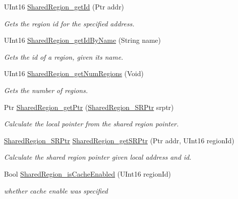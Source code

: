 \begin{DoxyCompactItemize}
UInt16 \hyperlink{_shared_region_8h_afc6f82dd851547d6d6221a779be945dd}{SharedRegion\_\-getId} (Ptr addr)
\begin{DoxyCompactList}\small\item\em Gets the region id for the specified address. \item\end{DoxyCompactList}\item 
UInt16 \hyperlink{_shared_region_8h_a67a530716a59b8794fee523cc8845f2c}{SharedRegion\_\-getIdByName} (String name)
\begin{DoxyCompactList}\small\item\em Gets the id of a region, given its name. \item\end{DoxyCompactList}\item 
UInt16 \hyperlink{_shared_region_8h_a5fb23b15b5321edd51438108b7fd9cfe}{SharedRegion\_\-getNumRegions} (Void)
\begin{DoxyCompactList}\small\item\em Gets the number of regions. \item\end{DoxyCompactList}\item 
Ptr \hyperlink{_shared_region_8h_a2b64c07cb305a034417a42fb1ed8e7a9}{SharedRegion\_\-getPtr} (\hyperlink{_shared_region_8h_a3efe06da0fa1fcbb3b271278ddd9b410}{SharedRegion\_\-SRPtr} srptr)
\begin{DoxyCompactList}\small\item\em Calculate the local pointer from the shared region pointer. \item\end{DoxyCompactList}\item 
\hyperlink{_shared_region_8h_a3efe06da0fa1fcbb3b271278ddd9b410}{SharedRegion\_\-SRPtr} \hyperlink{_shared_region_8h_a7362baec546e36b21e82f35746b4ab3b}{SharedRegion\_\-getSRPtr} (Ptr addr, UInt16 regionId)
\begin{DoxyCompactList}\small\item\em Calculate the shared region pointer given local address and id. \item\end{DoxyCompactList}\item 
Bool \hyperlink{_shared_region_8h_afcd99988acc5d3b6b9dd809c49692185}{SharedRegion\_\-isCacheEnabled} (UInt16 regionId)
\begin{DoxyCompactList}\small\item\em whether cache enable was specified \item\end{DoxyCompactList}\item 

\end{DoxyCompactItemize}
